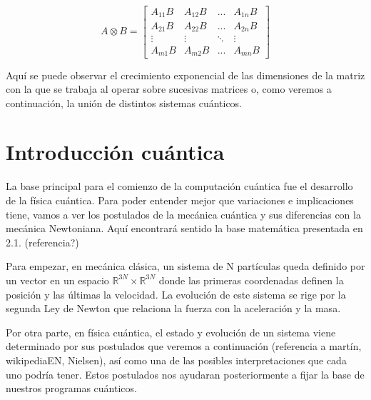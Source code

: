 \begin{equation*}
A\otimes B = \begin{bmatrix}
A_{11}B & A_{12}B & ... & A_{1n}B\\
A_{21}B & A_{22}B & ... & A_{2n}B\\
\vdots & \vdots & \ddots & \vdots\\
A_{m1}B & A_{m2}B & ... & A_{mn}B
\end{bmatrix}
\end{equation*}

\vspace{5pt}
Aquí se puede observar el crecimiento exponencial de las dimensiones de la matriz con la que se trabaja al operar sobre sucesivas matrices o, como veremos a continuación, la unión de distintos sistemas cuánticos.

\vspace{15pt}

\section{Introducción cuántica}
La base principal para el comienzo de la computación cuántica fue el desarrollo de la física cuántica. Para poder entender mejor que variaciones e implicaciones tiene, vamos a ver los postulados de la mecánica cuántica y sus diferencias con la mecánica Newtoniana. Aquí encontrará sentido la base matemática presentada en 2.1. (referencia?)

\vspace{5pt}

Para empezar, en mecánica clásica, un sistema de N partículas queda definido por un vector en un espacio $\mathbb{R}^{3N} \times \mathbb{R}^{3N}$ donde las primeras coordenadas definen la posición y las últimas la velocidad. La evolución de este sistema se rige por la segunda Ley de Newton que relaciona la fuerza con la aceleración y la masa.

\vspace{5pt}

Por otra parte, en física cuántica, el estado y evolución de un sistema viene determinado por sus postulados que veremos a continuación (referencia a martín, wikipediaEN, Nielsen), así como una de las posibles interpretaciones que cada uno podría tener. Estos postulados nos ayudaran posteriormente a fijar la base de nuestros programas cuánticos.
\vspace{10pt}

